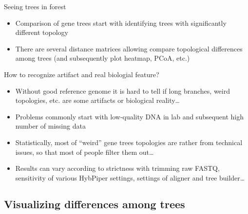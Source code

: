 \documentclass[compress, ucs, xelatex, 11pt, xcolor=x11names, aspectratio=169,
	hyperref={
		bookmarks=true,
		unicode=true,
		colorlinks=true,
		pdftitle={HybSeq course},
		plainpages=false,
		pdfauthor={Vojtech Zeisek},
		pdfsubject={Practical processing of HybSeq target enrichment sequencing data on computing grids like MetaCentrum},
		pdfcreator={XeLaTeX},
		pdfkeywords={BASH, command line, GNU, HybSeq, Linux, MetaCentrum, sequencing shell, target enrichment},
		linkcolor=Cyan2, %
		anchorcolor=Firebrick2, %
		citecolor=Firebrick2, %
		filecolor=Firebrick2, %
		menucolor=Firebrick2, %
		urlcolor=Chartreuse2, %
		pdftex},
	url={hyphens, lowtilde} %
	]{beamer}
\begin{document}
\begin{frame}{Seeing trees in forest}
	\begin{itemize}
		\item Comparison of gene trees start with identifying trees with significantly different topology
		\item There are several distance matrices allowing compare topological differences among trees (and subsequently plot heatmap, PCoA, etc.)
	\end{itemize}
	\begin{block}{How to recognize artifact and real biologial feature?}
		\begin{itemize}
			\item Without good reference genome it is hard to tell if long branches, weird topologies, etc. are some artifacts or biological reality\ldots
			\item Problems commonly start with low-quality DNA in lab and subsequent high number of missing data
			\item Statistically, most of \enquote{weird} gene trees topologies are rather from technical issues, so that most of people filter them out\ldots
			\item Results can vary according to strictness with trimming raw FASTQ, sensitivity of various HybPiper settings, settings of aligner and tree builder\ldots
		\end{itemize}
	\end{block}
\end{frame}

\subsection{Visualizing differences among trees}
\end{document}
